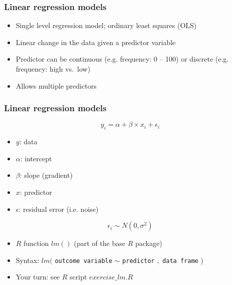 \begin{frame}
	\frametitle{Linear regression models}
	
	\begin{itemize}
		 \item Single level regression model; ordinary least squares (OLS)
		 \item Linear change in the data given a predictor variable 
		 \item Predictor can be continuous (e.g. frequency: 0 -- 100) or discrete (e.g. frequency: high vs.~low)
		 \item Allows multiple predictors 
	\end{itemize}

\end{frame}	


\begin{frame}
	\frametitle{Linear regression models}
	
	\begin{equation}
		y_i = \alpha + \beta \times x_{i} + \epsilon_i
	\end{equation}

\begin{minipage}{.4\textwidth}
	\begin{itemize}
		\item $y$: data
		\item $\alpha$: intercept
		\item $\beta$: slope (gradient)
		\end{itemize}
\end{minipage}
\hfill
\begin{minipage}{.5\textwidth}
	\begin{itemize}
		\item $x$: predictor
		\item $\epsilon$: residual error (i.e. noise)
	\end{itemize}
\end{minipage}
	\begin{equation}
		\epsilon_i \sim N(0,\sigma^2)
	\end{equation}
	
	\begin{itemize}
		\item $R$ function $lm()$ (part of the base $R$ package)
		\item Syntax: $lm($ \texttt{outcome variable} $\sim$ \texttt{predictor} $,$ \texttt{data frame} )
		\item Your turn: see $R$ script $exercise\_lm.R$
	\end{itemize}
	
\end{frame}


